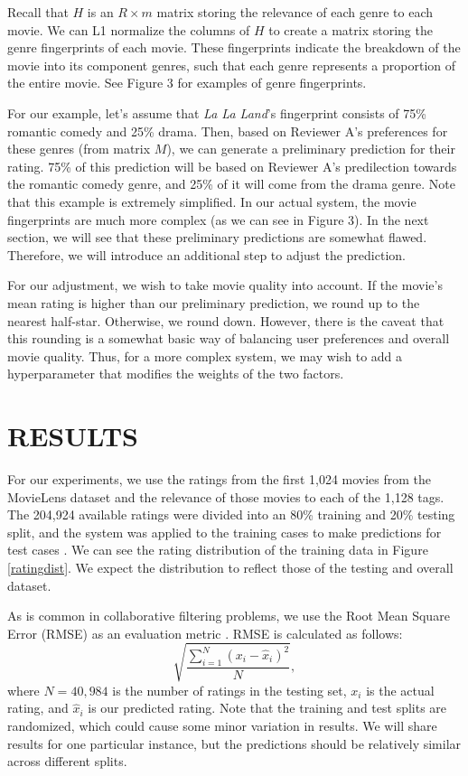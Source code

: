 \documentclass[letterpaper, 10 pt, conference]{ieeeconf}  %
\begin{document}
Recall that $H$ is an $R \times m$ matrix storing the relevance of each genre to each movie. We can L1 normalize the columns of $H$ to create a matrix storing the genre fingerprints of each movie.
These fingerprints indicate the breakdown of the movie into its component genres, such that each genre represents a proportion of the entire movie. See Figure 3 for examples of genre fingerprints.

For our example, let's assume that \textit{La La Land}'s fingerprint consists of 75\% romantic comedy and 25\% drama. Then, based on Reviewer A's preferences for these genres (from matrix $M$), we can generate a preliminary prediction for their rating. 75\% of this prediction will be based on Reviewer A's predilection towards the romantic comedy genre, and 25\% of it will come from the drama genre.
Note that this example is extremely simplified. In our actual system, the movie fingerprints are much more complex (as we can see in Figure 3). In the next section, we will see that these preliminary predictions are somewhat flawed. Therefore, we will introduce an additional step to adjust the prediction.

For our adjustment, we wish to take movie quality into account. If the movie's mean rating is higher than our preliminary prediction, we round up to the nearest half-star. Otherwise, we round down. However, there is the caveat that this rounding is a somewhat basic way of balancing user preferences and overall movie quality. Thus, for a more complex system, we may wish to add a hyperparameter that modifies the weights of the two factors.

\medbreak
\section{RESULTS}

For our experiments, we use the ratings from the first 1,024 movies from the MovieLens dataset and the relevance of those movies to each of the 1,128 tags. The 204,924 available ratings were divided into an 80\% training and 20\% testing split, and the system was applied to the training cases to make predictions for test cases \cite{lenskitmodule}. We can see the rating distribution of the training data in Figure \ref{ratingdist}. We expect the distribution to reflect those of the testing and overall dataset. 

As is common in collaborative filtering problems, we use the Root Mean Square Error (RMSE) as an evaluation metric \cite{lenskitmodule}. RMSE is calculated as follows: 
$$\sqrt{\frac{\sum_{i=1}^N (x_i - \hat{x}_i)^2}{N}},$$
where $N=40,984$ is the number of ratings in the testing set, $x_i$ is the actual rating, and $\hat{x}_i$ is our predicted rating. Note that the training and test splits are randomized, which could cause some minor variation in results. We will share results for one particular instance, but the predictions should be relatively similar across different splits.
\end{document}
